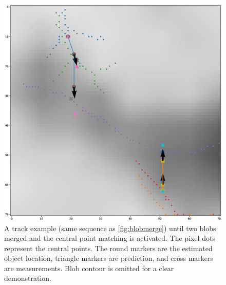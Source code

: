\begin{figure}
  \centering
  \includegraphics[width=\textwidth]{figures/trackexample2.eps}
  \caption{A track example (same sequence as \autoref{fig:blobmerge}) until two blobs merged and the central point matching is activated. The pixel dots represent the central points. The round markers are the estimated object location, triangle markers are prediction, and cross markers are measurements. Blob contour is omitted for a clear demonstration.}\label{fig:trackexample2}
\end{figure}
